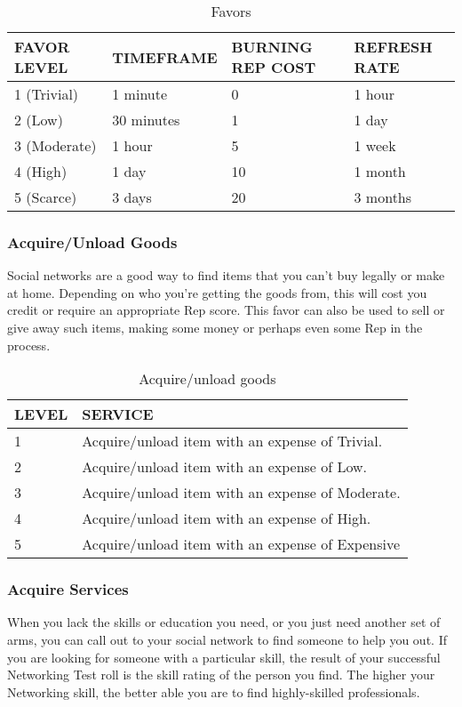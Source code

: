 \begin{table}
\caption{Favors}
\begin{tabular}{|l|l|l|l|}
\hline
FAVOR LEVEL & TIMEFRAME & BURNING REP COST & REFRESH RATE \\
\hline
1 (Trivial) & 1 minute & 0 & 1 hour \\
\hline
2 (Low) & 30 minutes & 1 & 1 day \\
\hline
3 (Moderate) & 1 hour & 5 & 1 week \\
\hline
4 (High) & 1 day & 10 & 1 month \\
\hline
5 (Scarce) & 3 days & 20 & 3 months \\
\hline
\end{tabular}
\end{table}


\subsubsection{Acquire/Unload Goods}

Social networks are a good way to find items that 
you can't buy legally or make at home. Depending 
on who you're getting the goods from, this will cost 
you credit or require an appropriate Rep score. This 
favor can also be used to sell or give away such items, 
making some money or perhaps even some Rep in 
the process.

\begin{table}
\caption{Acquire/unload goods}
\begin{tabular}{|l|l|}
\hline
LEVEL & SERVICE \\
\hline
1 & Acquire/unload item with an expense of Trivial. \\
\hline
2 & Acquire/unload item with an expense of Low. \\
\hline
3 & Acquire/unload item with an expense of Moderate. \\
\hline
4 & Acquire/unload item with an expense of High. \\
\hline
5 & Acquire/unload item with an expense of Expensive \\
\hline
\end{tabular}
\end{table}


\subsubsection{Acquire Services}

When you lack the skills or education you need, or 
you just need another set of arms, you can call out 
to your social network to find someone to help you 
out. If you are looking for someone with a particular 
skill, the result of your successful Networking Test roll 
is the skill rating of the person you find. The higher 
your Networking skill, the better able you are to find 
highly-skilled professionals.

